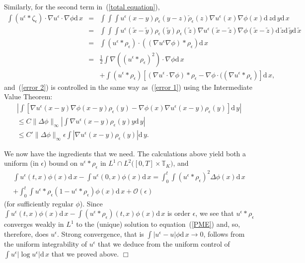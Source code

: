 \documentclass[12pt]{article}
\newenvironment {proof}{{\noindent\bf Proof }}{\hfill $\Box$ \medskip}
\def \tilde{\widetilde}
\newcommand{\IT}{\mathbb T}
\newcommand{\dif}{\mathrm{d}\,}
\begin{document}
\begin{proof}
Similarly, for the second term in~(\ref{total equation}),
\begin{eqnarray}
\nonumber
\int (u^\epsilon*\zeta_\epsilon)\cdot \nabla u^\epsilon\cdot\nabla\phi \dif x
&=&
\int\int\int u^\epsilon(x-y)\rho_\epsilon(y-z)
\check{\rho}_\epsilon(z)\nabla u^\epsilon(x)\nabla\phi(x)\dif z \dif y \dif x
\\
\nonumber
&=&
\int\int\int u^\epsilon(\tilde{x}-\tilde{y})\rho_\epsilon(\tilde{y})
\rho_\epsilon(\tilde{z})\nabla u^\epsilon(\tilde{x}-\tilde{z})
\nabla\phi(\tilde{x}-\tilde{z})\dif \tilde{z}\dif \tilde{y} \dif\tilde{x}
\\
\nonumber
&=&\int(u^\epsilon*\rho_\epsilon)\cdot
\left((\nabla u^\epsilon\nabla\phi)*\rho_\epsilon\right) \dif x\\
\nonumber
&=&
\frac{1}{2}\int\nabla ((u^\epsilon*\rho_\epsilon)^2)\cdot\nabla\phi \dif x
\\
\label{error 2}
&&+
\int (u^\epsilon*\rho_\epsilon)
\left[(\nabla u^\epsilon\cdot\nabla\phi)*\rho_\epsilon-
\nabla\phi\cdot((\nabla u^\epsilon*\rho_\epsilon)\right]\dif x,
\end{eqnarray}
and~(\ref{error 2}) is controlled in the same way as~(\ref{error 1})
using the Intermediate Value Theorem:
\begin{multline*}
\left|\int\left[\nabla u^\epsilon(x-y)\nabla\phi(x-y)\rho_\epsilon(y)
-\nabla\phi(x)\nabla u^\epsilon(x-y)\rho_\epsilon(y)
\right]\dif y\right|
\\
\leq C\|\Delta\phi\|_\infty\left|\int \nabla u^\epsilon(x-y)\rho_\epsilon(y)y
\dif y\right|\\
\leq C'\|\Delta\phi\|_\infty\epsilon \int\left|
\nabla u^\epsilon(x-y)\rho_\epsilon(y)
\right|\dif y.
\end{multline*}

We now have the ingredients that we need.
The calculations above yield both a uniform (in $\epsilon$) bound on
$u^\epsilon*\rho_\epsilon$ in
$L^1\cap L^2\big([0,T]\times \IT_K\big)$, and
\begin{multline}
\int u^\epsilon(t,x)\phi(x)\dif x-\int u^\epsilon (0,x)\phi(x)\dif x
=\int_0^t\int (u^\epsilon*\rho_\epsilon)^2\Delta\phi(x)\dif x
\\
+\int_0^t \int u^\epsilon*\rho_\epsilon\left(1- u^\epsilon*\rho_\epsilon\right)
\phi(x)\dif x
+\mathcal{O}(\epsilon)
\end{multline}
(for sufficiently regular $\phi$). Since
$\int u^\epsilon(t,x)\phi(x)\dif x-
\int (u^\epsilon*\rho_\epsilon)(t,x)\phi(x)\dif x$ is order $\epsilon$, we see
that $u^\epsilon*\rho_\epsilon$ converges weakly in $L^1$ to the (unique)
solution
to equation~(\ref{PME})
and, so, therefore, does $u^\epsilon$. Strong convergence, that is
$\int |u^\epsilon -u|\phi\dif x \to 0$, follows from the
uniform integrability of $u^\epsilon$ that we
deduce from the uniform control of
$\int u^\epsilon|\log u^\epsilon|\dif x$ that we proved above.
\end{proof}
\end{document}
